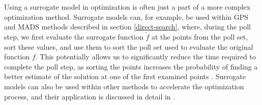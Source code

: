 Using a surrogate model in optimization is often just a part of a more complex optimization method. Surrogate models can, for example, be used within GPS and MADS methods described in section \ref{direct-search}, where, during the poll step, we first evaluate the surrogate function \( \tilde{f} \) at the points from the poll set, sort these values, and use them to sort the poll set used to evaluate the original function \( f \). This potentially allows us to significantly reduce the time required to complete the poll step, as sorting the points increases the probability of finding a better estimate of the solution at one of the first examined points \cite{BBO-textbook}. Surrogate models can also be used within other methods to accelerate the optimization process, and their application is discussed in detail in \cite{BBO-textbook, two-decades}.
